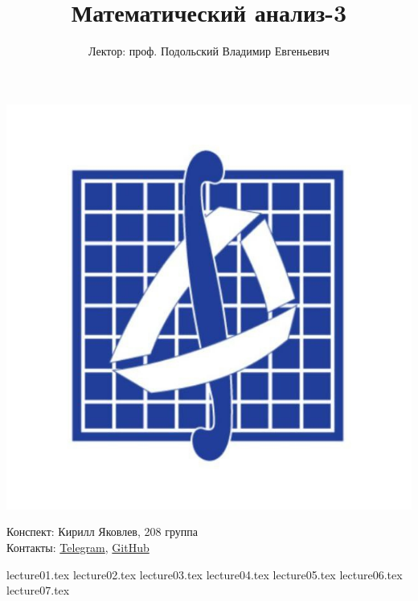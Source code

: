 \documentclass[a4paper, 12pt]{article}
\title{\textbf{Математический анализ-3}}
\author{Лектор: проф. Подольский Владимир Евгеньевич}
\begin{document}
    
\fontsize{14pt}{20pt}\selectfont
\maketitle
\vspace{0.3cm}
\begin{center}
    \includegraphics[width=0.75\linewidth]{Images/mehmat.png}
\end{center}
\vspace{1.5cm}
\begin{center}
    Конспект: Кирилл Яковлев, 208 группа\\
    Контакты: \href{https://t.me/fourkenz}{Telegram}, \href{https://github.com/yakovlevki}{GitHub}\\
\end{center}
    
\newpage
\tableofcontents
\newpage

{lecture01.tex}
{lecture02.tex}
{lecture03.tex}
{lecture04.tex}
{lecture05.tex}
{lecture06.tex}
{lecture07.tex}
\end{document}
